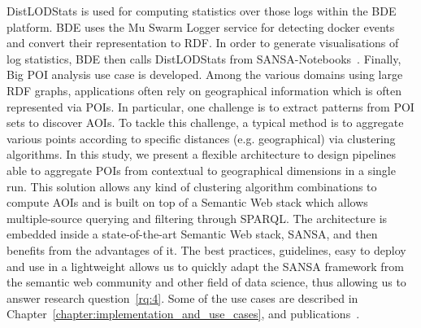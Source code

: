 \begin{enumerate}
    DistLODStats is used for computing statistics over those logs within the BDE platform. 
    BDE uses the Mu Swarm Logger service for detecting docker events and convert their representation to \gls{RDF}. 
    In order to generate visualisations of log statistics, BDE then calls DistLODStats from SANSA-Notebooks~\cite{iermilov-2017-sansa-iswc-demo}.
    Finally, Big \gls{POI} analysis use case is developed.
    Among the various domains using large \gls{RDF} graphs, applications often rely on geographical information which is often represented via \gls{POI}s.
    In particular, one challenge is to extract patterns from \gls{POI} sets to discover \gls{AOI}s.
    To tackle this challenge, a typical method is to aggregate various points according to specific distances (e.g. geographical) via clustering algorithms. 
    In this study, we present a flexible architecture to design pipelines able to aggregate \gls{POI}s from contextual to geographical dimensions in a single run. 
    This solution allows any kind of clustering algorithm combinations to compute \gls{AOI}s and is built on top of a Semantic Web stack which allows multiple-source querying and filtering through \gls{SPARQL}.
    The architecture is embedded inside a state-of-the-art Semantic Web stack, SANSA, and then benefits from the advantages of it.
    The best practices, guidelines, easy to deploy and use in a lightweight allows us to quickly adapt the SANSA framework from the semantic web community and other field of data science, thus allowing us to answer research question~\ref{rq:4}.
    Some of the use cases are described in Chapter~\ref{chapter:implementation_and_use_cases}, and publications~\cite{lehmann-2017-sansa-iswc, iermilov-2017-sansa-iswc-demo, sansa-hubs-and-authorities-transaction-semantics19-poster, piping-clustering-eswc19-poster, graux-2018-sansa-ethereum-semantics-poster, Auer+ICWE-2017}.

\end{enumerate}


